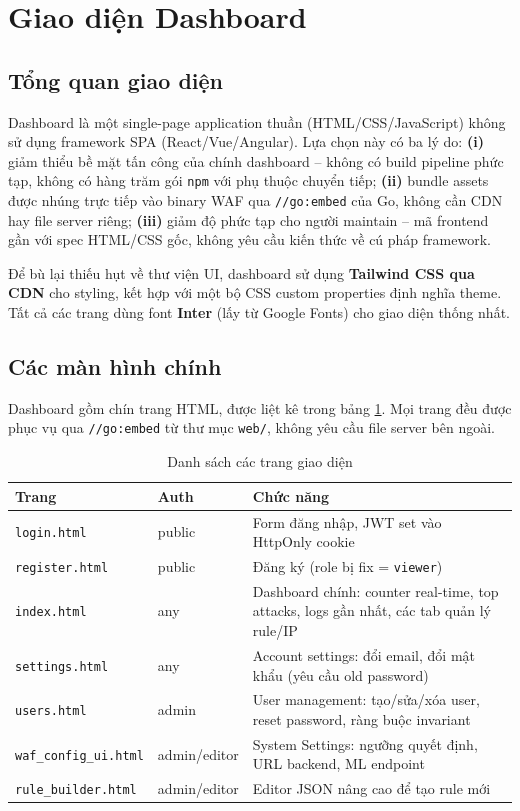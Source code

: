 \documentclass[../DoAn.tex]{subfiles}
\begin{document}
\section{Giao diện Dashboard}
\label{section:4.5}

\subsection{Tổng quan giao diện}
\label{subsection:4.5.1}

Dashboard là một single-page application thuần (HTML/CSS/JavaScript) không
sử dụng framework SPA (React/Vue/Angular). Lựa chọn này có ba lý do:
\textbf{(i)} giảm thiểu bề mặt tấn công của chính dashboard -- không có
build pipeline phức tạp, không có hàng trăm gói \texttt{npm} với phụ thuộc
chuyển tiếp; \textbf{(ii)} bundle assets được nhúng trực tiếp vào binary
WAF qua \texttt{//go:embed} của Go, không cần CDN hay file server riêng;
\textbf{(iii)} giảm độ phức tạp cho người maintain -- mã frontend gần với
spec HTML/CSS gốc, không yêu cầu kiến thức về cú pháp framework.

Để bù lại thiếu hụt về thư viện UI, dashboard sử dụng \textbf{Tailwind CSS
qua CDN} cho styling, kết hợp với một bộ CSS custom properties định nghĩa
theme. Tất cả các trang dùng font \textbf{Inter} (lấy từ Google Fonts) cho
giao diện thống nhất.

\subsection{Các màn hình chính}
\label{subsection:4.5.2}

Dashboard gồm chín trang HTML, được liệt kê trong bảng \ref{table:web-pages}.
Mọi trang đều được phục vụ qua \texttt{//go:embed} từ thư mục \texttt{web/},
không yêu cầu file server bên ngoài.

\begin{table}[h!]
\centering
\caption{Danh sách các trang giao diện}
\label{table:web-pages}
\small
\begin{tabular}{|l|l|p{6cm}|}
\hline
\textbf{Trang} & \textbf{Auth} & \textbf{Chức năng} \\
\hline
\texttt{login.html} & public & Form đăng nhập, JWT set vào HttpOnly cookie \\
\hline
\texttt{register.html} & public & Đăng ký (role bị fix = \texttt{viewer}) \\
\hline
\texttt{index.html} & any & Dashboard chính: counter real-time, top attacks, logs gần nhất, các tab quản lý rule/IP \\
\hline
\texttt{settings.html} & any & Account settings: đổi email, đổi mật khẩu (yêu cầu old password) \\
\hline
\texttt{users.html} & admin & User management: tạo/sửa/xóa user, reset password, ràng buộc invariant \\
\hline
\texttt{waf\_config\_ui.html} & admin/editor & System Settings: ngưỡng quyết định, URL backend, ML endpoint \\
\hline
\texttt{rule\_builder.html} & admin/editor & Editor JSON nâng cao để tạo rule mới \\
\hline
\end{tabular}
\end{table}
\end{document}
